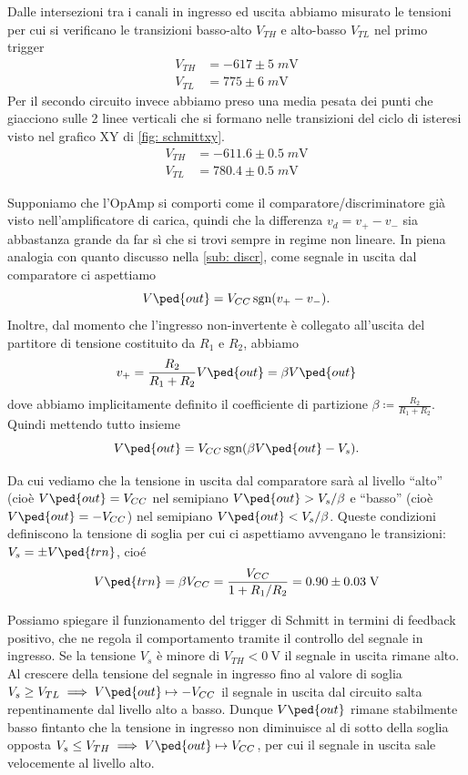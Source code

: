 \documentclass[10pt, a4paper, italian]{article}
\begin{document}
Dalle intersezioni tra i canali in ingresso ed uscita abbiamo misurato le
tensioni per cui si verificano le transizioni basso-alto $V_{TH}$ e alto-basso
$V_{TL}$ nel primo trigger
\begin{align*}
V_{TH} &= -617 \pm 5 \; \si{m\V} \\
V_{TL} &= 775 \pm 6 \; \si{m\V}
\end{align*}
Per il secondo circuito invece abbiamo preso una media pesata dei punti che
giacciono sulle 2 linee verticali che si formano nelle transizioni del ciclo
di isteresi visto nel grafico XY di \cref{fig: schmittxy}.
\begin{align*}
V_{TH} &= -611.6 \pm 0.5 \; \si{m\V} \\
V_{TL} &= 780.4 \pm 0.5 \; \si{m\V}
\end{align*}

Supponiamo che l'OpAmp si comporti come il comparatore/discriminatore già
visto nell'amplificatore di carica, quindi che la differenza
$v_d = v_+ - v_- $ sia abbastanza grande da far sì che si trovi sempre in
regime non lineare. In piena analogia con quanto discusso nella
\cref{sub: discr}, come segnale in uscita dal comparatore ci aspettiamo
\[
V\ped{out} = V_{CC} \sgn(v_+ - v_-)
.\]
Inoltre, dal momento che l'ingresso non-invertente è collegato all'uscita del
partitore di tensione costituito da $R_1$ e $R_2$, abbiamo
\[
v_+ = \frac{R_2}{R_1 + R_2} V \ped{out} = \beta V\ped{out}
\]
dove abbiamo implicitamente definito il coefficiente di partizione
$\beta \coloneqq \frac{R_2}{R_1 + R_2}$. Quindi mettendo tutto insieme
\[
V\ped{out} = V_{CC} \sgn(\beta V\ped{out} - V_s)
.\]

Da cui vediamo che la tensione in uscita dal comparatore sarà al livello
``alto'' (cioè $V\ped{out} = V_{CC}$ nel semipiano
$V\ped{out} > V_s/\beta$ e ``basso'' (cioè $V\ped{out} = -V_{CC}$)
nel semipiano $V\ped{out} < V_s/\beta$. Queste condizioni definiscono la
tensione di soglia per cui ci aspettiamo avvengano le transizioni:
$V_s = \pm V\ped{trn}$, cioé
\begin{equation}
V\ped{trn} = \beta V_{CC} = \frac{V_{CC}}{1 + R_1/R_2} =
0.90 \pm 0.03 \; \si{\V}
\end{equation}

Possiamo spiegare il funzionamento del trigger di Schmitt in termini di
feedback positivo, che ne regola il comportamento tramite il controllo del
segnale in ingresso. Se la tensione $V_s$ è minore di $V_{TH} < \SI{0}{\V}$
il segnale in uscita rimane alto. Al crescere della tensione del segnale
in ingresso fino al valore di soglia
$V_s \geq V_{TL} \implies V\ped{out} \mapsto -V_{CC}$ il segnale in uscita
dal circuito salta repentinamente dal livello alto a basso. Dunque
$V\ped{out}$ rimane stabilmente basso fintanto che la tensione in ingresso
non diminuisce al di sotto della soglia opposta
$V_s \leq V_{TH} \implies V\ped{out} \mapsto V_{CC}$, per cui il segnale in
uscita sale velocemente al livello alto.
\end{document}
